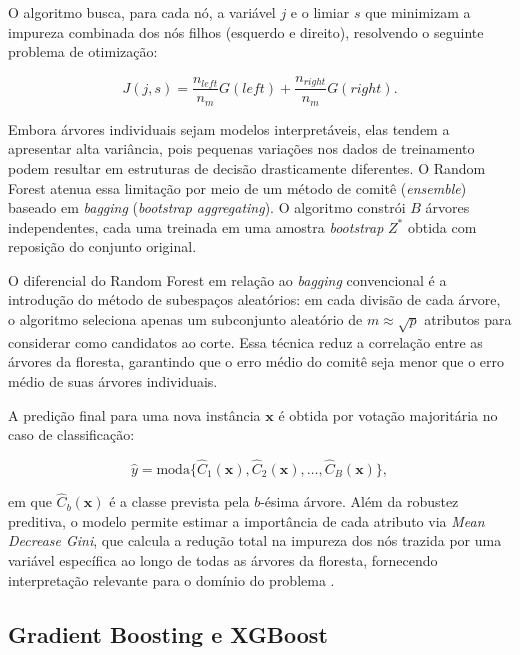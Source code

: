 O algoritmo busca, para cada nó, a variável $j$ e o limiar $s$ que minimizam a impureza combinada dos nós filhos (esquerdo e direito), resolvendo o seguinte problema de otimização:

\begin{equation}
J(j, s) = \frac{n_{left}}{n_m} G(left) + \frac{n_{right}}{n_m} G(right).
\end{equation}

Embora árvores individuais sejam modelos interpretáveis, elas tendem a apresentar alta variância, pois pequenas variações nos dados de treinamento podem resultar em estruturas de decisão drasticamente diferentes. O Random Forest \cite{breiman2001randomForest} atenua essa limitação por meio de um método de comitê (\textit{ensemble}) baseado em \textit{bagging} (\textit{bootstrap aggregating}). O algoritmo constrói $B$ árvores independentes, cada uma treinada em uma amostra \textit{bootstrap} $Z^*$ obtida com reposição do conjunto original.

O diferencial do Random Forest em relação ao \textit{bagging} convencional é a introdução do método de subespaços aleatórios: em cada divisão de cada árvore, o algoritmo seleciona apenas um subconjunto aleatório de $m \approx \sqrt{p}$ atributos para considerar como candidatos ao corte. Essa técnica reduz a correlação entre as árvores da floresta, garantindo que o erro médio do comitê seja menor que o erro médio de suas árvores individuais.

A predição final para uma nova instância $\mathbf{x}$ é obtida por votação majoritária no caso de classificação:

\begin{equation}
\hat{y} = \text{moda} \{ \hat{C}_1(\mathbf{x}), \hat{C}_2(\mathbf{x}), \dots, \hat{C}_B(\mathbf{x}) \},
\end{equation}

em que $\hat{C}_b(\mathbf{x})$ é a classe prevista pela $b$-ésima árvore. Além da robustez preditiva, o modelo permite estimar a importância de cada atributo via \textit{Mean Decrease Gini}, que calcula a redução total na impureza dos nós trazida por uma variável específica ao longo de todas as árvores da floresta, fornecendo interpretação relevante para o domínio do problema \cite{russell2016artificial}.

\subsection{Gradient Boosting e XGBoost}

